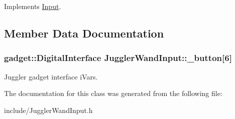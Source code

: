 Implements \hyperlink{class_input_ab927e3b2f1735052f6f1ef3f3bf7b29c}{Input}.

\subsection{Member Data Documentation}
\hypertarget{class_juggler_wand_input_abab4f0c7699fccd0d52b3d337a509cf9}{
\subsubsection[{\_\-button}]{\setlength{\rightskip}{0pt plus 5cm}gadget::DigitalInterface {\bf JugglerWandInput::\_\-button}\mbox{[}6\mbox{]}}}
\label{class_juggler_wand_input_abab4f0c7699fccd0d52b3d337a509cf9}
Juggler gadget interface iVars. 

The documentation for this class was generated from the following file:\begin{DoxyCompactItemize}
\item 
include/JugglerWandInput.h\end{DoxyCompactItemize}
